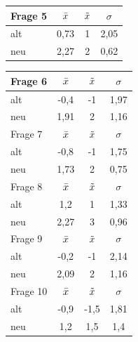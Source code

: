 \begin{table}[H]
\begin{tabular}{|l|c|c|c|}
\hline
Frage 5   & $\Bar{x}$ & $\Tilde{x}$ & $\sigma$ \\ \hline
alt       & 0,73      &  1          &  2,05    \\ \hline
neu       & 2,27      &  2          &  0,62    \\ \hline
\end{tabular}
\begin{tabular}{|l|c|c|c|}
\hline
Frage 6   & $\Bar{x}$ & $\Tilde{x}$ & $\sigma$ \\ \hline
alt       & -0,4      &  -1         &  1,97    \\ \hline
neu       & 1,91      &  2          &  1,16    \\ \hline
\hline
Frage 7   & $\Bar{x}$ & $\Tilde{x}$ & $\sigma$ \\ \hline
alt       & -0,8      &  -1         &  1,75    \\ \hline
neu       & 1,73      &  2          &  0,75    \\ \hline
\hline
Frage 8   & $\Bar{x}$ & $\Tilde{x}$ & $\sigma$ \\ \hline
alt       & 1,2       &  1         &  1,33    \\ \hline
neu       & 2,27      &  3         &  0,96    \\ \hline
\hline
Frage 9   & $\Bar{x}$ & $\Tilde{x}$ & $\sigma$ \\ \hline
alt       & -0,2      &  -1         &  2,14    \\ \hline
neu       & 2,09      &  2          &  1,16    \\ \hline
\hline
Frage 10   & $\Bar{x}$ & $\Tilde{x}$ & $\sigma$ \\ \hline
alt       & -0,9       &  -1,5       &  1,81    \\ \hline
neu       & 1,2        &  1,5        &  1,4    \\ \hline
\end{tabular}


\end{table}
